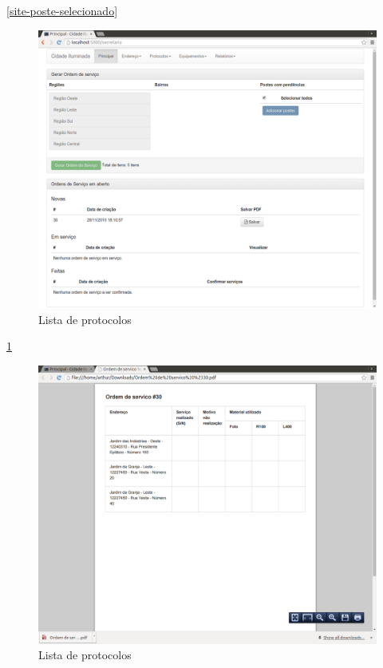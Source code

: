 \documentclass[
	article,			%
	11pt,				%
	oneside,			%
	a4paper,			%
	english,			%
	brazil,				%
	sumario=tradicional
	]{abntex2}
\begin{document}
\ref{site-poste-selecionado}

\begin{figure}[!htbp]
 \centering
 \caption{\label{site-os-gerada}Lista de protocolos}
 \includegraphics[scale=0.25]{site/11-os_gerada.png}
\end{figure}

\ref{site-os-gerada}
\clearpage

\begin{figure}[!htbp]
 \centering
 \caption{\label{site-pdf}Lista de protocolos}
 \includegraphics[scale=0.25]{site/12-pdf.png}
\end{figure}
\end{document}
